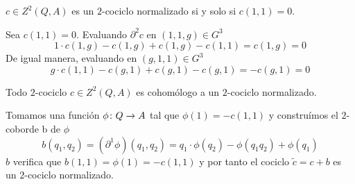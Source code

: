 \begin{proposicion}
	$c\in Z^2(Q,A)$ es un $2$-cociclo normalizado si y solo si $c(1,1)=0$.
	\begin{demostracion}
		Sea $c(1,1) = 0$. Evaluando $\partial^2 c$ en $(1,1,g)\in G^3$
		\begin{equation*}
			1\cdot c(1,g) - c(1,g) + c(1,g) - c(1,1) = c(1,g) =0
		\end{equation*} 
		De igual manera, evaluando en $(g,1,1)\in G^3$
		\begin{equation*}
			g\cdot c(1,1) - c(g,1) + c(g,1) - c(g,1) = -c(g,1) = 0
		\end{equation*}
	\end{demostracion}
\end{proposicion}

\begin{proposicion}\label{prop:normcoc}
	Todo $2$-cociclo $c\in Z^2(Q,A)$ es cohomólogo a un $2$-cociclo normalizado. %
	\begin{demostracion}
		Tomamos una función $\phi\colon Q\to A$ tal que $\phi(1) = -c(1,1)$ y construímos el $2$-coborde b de $\phi$
		\begin{equation*}
			b(q_1,q_2) = (\partial^1 \phi)(q_1,q_2) =  q_1\cdot \phi(q_2) - \phi(q_1q_2) + \phi(q_1)
		\end{equation*}
		$b$ verifica que $b(1,1) = \phi(1) = -c(1,1)$ y por tanto el cociclo $\tilde c = c+b$ es un $2$-cociclo normalizado.
	\end{demostracion}
\end{proposicion}

